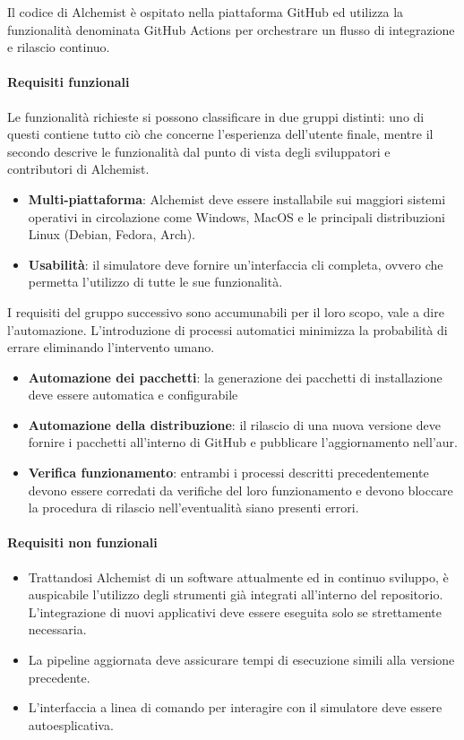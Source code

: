 \documentclass[12pt,a4paper,openright,twoside]{book}
\begin{document}
Il codice di Alchemist è ospitato nella piattaforma GitHub ed utilizza la funzionalità denominata GitHub Actions per orchestrare un flusso di integrazione e rilascio continuo. 

\paragraph{Requisiti funzionali}

Le funzionalità richieste si possono classificare in due gruppi distinti: uno di questi contiene tutto ciò che concerne l'esperienza dell'utente finale, mentre il secondo descrive le funzionalità dal punto di vista degli sviluppatori e contributori di Alchemist.
\begin{itemize}
	\item \textbf{Multi-piattaforma}: Alchemist deve essere installabile sui maggiori sistemi operativi in circolazione come Windows, MacOS e le principali distribuzioni Linux (Debian, Fedora, Arch).
	\item \textbf{Usabilità}: il simulatore deve fornire un'interfaccia \ac{cli} completa, ovvero che permetta l'utilizzo di tutte le sue funzionalità.
\end{itemize}

I requisiti del gruppo successivo sono accumunabili per il loro scopo, vale a dire l'automazione. L'introduzione di processi automatici minimizza la probabilità di errare eliminando l'intervento umano. 

\begin{itemize}
	\item \textbf{Automazione dei pacchetti}: la generazione dei pacchetti di installazione deve essere automatica e configurabile
	\item \textbf{Automazione della distribuzione}: il rilascio di una nuova versione deve fornire i pacchetti all'interno di GitHub e pubblicare l'aggiornamento nell'\ac{aur}.
	\item \textbf{Verifica funzionamento}: entrambi i processi descritti precedentemente devono essere corredati da verifiche del loro funzionamento e devono bloccare la procedura di rilascio nell'eventualità siano presenti errori.
\end{itemize}

\paragraph{Requisiti non funzionali}

\begin{itemize}
	\item Trattandosi Alchemist di un software attualmente ed in continuo sviluppo, è auspicabile l'utilizzo degli strumenti già integrati all'interno del repositorio. L'integrazione di nuovi applicativi deve essere eseguita solo se strettamente necessaria.
	\item La pipeline aggiornata deve assicurare tempi di esecuzione simili alla versione precedente.
	\item L'interfaccia a linea di comando per interagire con il simulatore deve essere autoesplicativa.
\end{itemize}
\end{document}

